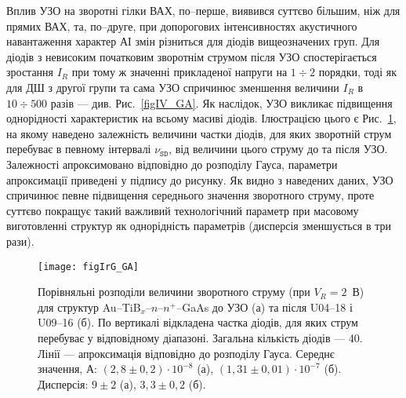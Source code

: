 Вплив УЗО на зворотні гілки ВАХ, по--перше, виявився суттєво більшим, ніж для прямих ВАХ, та, по--друге,
при допорогових інтенсивностях акустичного навантаження характер АІ змін різниться для діодів вищеозначених груп.
Для діодів з невисоким початковим зворотнім струмом після УЗО спостерігається зростання $I_R$ при тому ж значенні прикладеної напруги на $1\div2$ порядки,
тоді як для ДШ з другої групи та сама УЗО спричинює зменшення величини $I_R$ в $10\div500$ разів --- див. Рис.~\ref{figIV_GA}.
Як наслідок, УЗО викликає підвищення однорідності характеристик на всьому масиві діодів.
Ілюстрацією цього є Рис.~\ref{figIrG_GA}, на якому наведено залежність величини частки діодів, для яких зворотній струм перебуває в певному інтервалі $\nu_\mathtt{SD}$,
від величини цього струму до та після УЗО.
Залежності апроксимовано відповідно до розподілу Гауса, параметри апроксимації приведені у підпису до рисунку.
Як видно з наведених даних, УЗО спричинює певне підвищення середнього значення зворотного струму, проте суттєво
покращує такий важливий технологічний параметр при масовому виготовленні структур як однорідність параметрів (дисперсія зменшується в три рази).

\begin{figure}
\center
\texttt{[image: figIrG\_GA]}%
\caption{\label{figIrG_GA}
Порівняльні розподіли величини зворотного струму (при $V_R=2$~В)
для структур Au--TiB$_x$--$n$--$n^+$--GaAs до УЗО (а) та після U04--18 і U09--16 (б).
По вертикалі відкладена частка діодів, для яких струм перебуває у відповідному діапазоні.
Загальна кількість діодів --- 40.
Лінії --- апроксимація відповідно до розподілу Гауса.
Середнє значення, А:
$(2,8\pm0,2)\cdot10^{-8}$ (а),
$(1,31\pm0,01)\cdot10^{-7}$ (б).
Дисперсія:
$9\pm2$ (а),
$3,3\pm0,2$ (б).
}
\end{figure}


